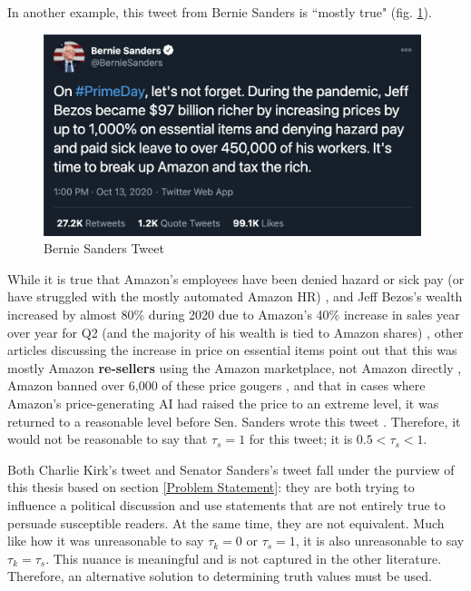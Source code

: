 \documentclass[preprint,review,12pt]{elsarticle}
\begin{document}
In another example, this tweet from Bernie Sanders is ``mostly true" (fig. \ref{fig:Bernie Sanders Tweet, Oct 13, 2020}). 
 \begin{figure}[h]
    \centering
    \includegraphics[width=11cm]{BernieTweet.png}
    \caption{Bernie Sanders Tweet \cite{sanders2020tweet}}
    \label{fig:Bernie Sanders Tweet, Oct 13, 2020}
\end{figure}
While it is true that Amazon's employees have been denied hazard or sick pay (or have struggled with the mostly automated Amazon HR) \cite{cnbc2020amazon,guardian2020amazon}, and Jeff Bezos's wealth increased by almost 80\% during 2020 due to Amazon's 40\% increase in sales year over year for Q2 (and the majority of his wealth is tied to Amazon shares) \cite{Stebbins2020bezos}, other articles discussing the increase in price on essential items point out that this was mostly Amazon \textbf{re-sellers} using the Amazon marketplace, not Amazon directly \cite{nicas2020sanitizer, kim2020price,gibson2020amazon}, Amazon banned over 6,000 of these price gougers \cite{bezos2020letter}, and that in cases where Amazon's price-generating AI had raised the price to an extreme level, it was returned to a reasonable level before Sen. Sanders wrote this tweet \cite{harman2020prime}. Therefore, it would not be reasonable to say that $\tau_s = 1$ for this tweet; it is $ 0.5 < \tau_s < 1$. 

Both Charlie Kirk's tweet and Senator Sanders's tweet fall under the purview of this thesis based on section \ref{Problem Statement}: they are both trying to influence a political discussion and use statements that are not entirely true to persuade susceptible readers. At the same time, they are not equivalent. Much like how it was unreasonable to say $\tau_k = 0$ or $\tau_s = 1$, it is also unreasonable to say $\tau_k = \tau_s$. This nuance is meaningful and is not captured in the other literature. Therefore, an alternative solution to determining truth values must be used.
\end{document}
